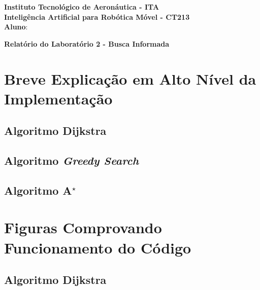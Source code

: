 \documentclass[brazil, 12pt]{article}
\begin{document}
\begin{center}
\textbf{Instituto Tecnológico de Aeronáutica - ITA} \\
\textbf{Inteligência Artificial para Robótica Móvel - CT213} \\
\textbf{Aluno}:     %
\end{center}

\begin{center}
\textbf{Relatório do Laboratório 2 - Busca Informada}
\end{center}
\vspace*{0.5cm}

\section{Breve Explicação em Alto Nível da Implementação}

\subsection{Algoritmo Dijkstra}

\subsection{Algoritmo \emph{Greedy Search}}

\subsection{Algoritmo A$^{\star}$}



\section{Figuras Comprovando Funcionamento do Código}

\subsection{Algoritmo Dijkstra}
\end{document}
